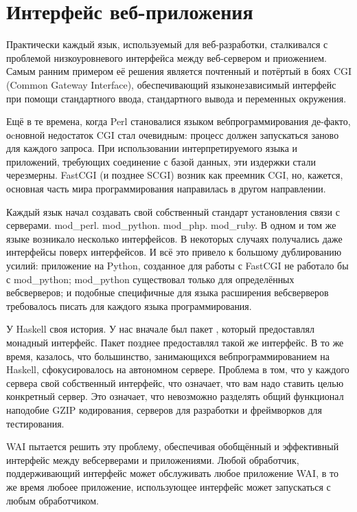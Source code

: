 \chapter {Интерфейс веб-приложения}\label{chap:web_application_interface}

Практически каждый язык, используемый для веб-разработки, сталкивался с проблемой
низкоуровневого интерфейса между веб-сервером и приожением. Самым ранним примером
её решения является почтенный и потёртый в боях CGI (Common Gateway Interface), 
обеспечивающий языконезависимый интерфейс при помощи стандартного ввода, стандартного
вывода и переменных окружения.

Ещё в те времена, когда Perl становалися языком вебпрограммирования де-факто, оcновной
недостаток CGI стал очевидным: процесс должен запускаться заново для каждого запроса.
При использовании интерпретируемого языка и приложений, требующих соединение с базой
данных, эти издержки стали черезмерны. FastCGI (и позднее SCGI) возник как преемник
CGI, но, кажется, основная часть мира программирования направилась в другом направлении.

Каждый язык начал создавать свой собственный стандарт установления связи с серверами.
mod\_perl. mod\_python. mod\_php. mod\_ruby. В одном и том же языке возникало несколько
интерфейсов. В некоторых случаях получались даже интерфейсы поверх интерфейсов.
И всё это привело к большому дублированию усилий: приложение на Python, созданное
для работы с FastCGI не работало бы с mod\_python; mod\_python существовал только для
определённых вебсверверов; и подобные специфичные для языка расширения вебсверверов
требовалось писать для каждого языка программирования.

У Haskell своя история. У нас вначале был пакет ,
который предоставлял монадный интерфейс. Пакет 
позднее предоставлял такой же интерфейс. В то же время, казалось, что большинство,
занимающихся вебпрограммированием на Haskell, сфокусировалось на автономном сервере.
Проблема в том, что у каждого сервера свой собственный интерфейс, что означает, что 
вам надо ставить целью конкретный сервер. Это означает, что невозможно разделять
общий функционал наподобие GZIP кодирования, серверов для разработки и фреймворков для тестирования.

WAI пытается решить эту проблему, обеспечивая обобщённый и эффективный интерфейс между
вебсерверами и приложениями. Любой обработчик, поддерживающий интерфейс может обслуживать
любое приложение WAI, в то же время любоее приложение, использующее интерфейс может
запускаться с любым обработчиком.

